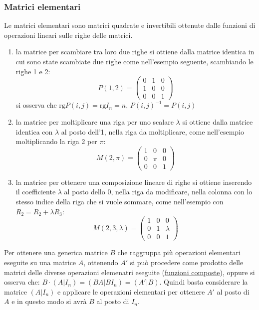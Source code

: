 \documentclass[a4paper]{article}
\newcommand\rg{\text{rg}} 		%
\begin{document}
\subsubsection*{Matrici elementari}
Le matrici elementari sono matrici quadrate e invertibili ottenute dalle funzioni di operazioni lineari sulle righe delle matrici.
\begin{enumerate}
	\item la matrice per scambiare tra loro due righe si ottiene dalla matrice identica in cui sono state scambiate due righe
	come nell'esempio seguente, scambiando le righe 1 e 2:
	\[P(1,2) = \begin{pmatrix}
		0 & 1 & 0 \\
		1 & 0 & 0 \\
		0 & 0 & 1
	\end{pmatrix}\]
	si osserva che \(\rg P(i,j) = \rg I_n = n\), \(P(i,j)^{-1} = P(i,j)\)
	
	\item la matrice per moltiplicare una riga per uno scalare \(\lambda\) si ottiene dalla matrice identica con \(\lambda\)
	al posto dell'1, nella riga da moltiplicare, come nell'esempio moltiplicando la riga 2 per \(\pi\):
	\[M(2,\pi) = \begin{pmatrix}
		1 & 0 & 0 \\
		0 & \pi & 0 \\
		0 & 0 & 1
	\end{pmatrix}\]
	
	\item la matrice per ottenere una composizione lineare di righe si ottiene inserendo il coefficiente \(\lambda\) al posto
	dello 0, nella riga da modificare, nella colonna con lo stesso indice della riga che si vuole sommare, come nell'esempio
	con \(R_2 = R_2 + \lambda R_3\):
	\[M(2, 3, \lambda) = \begin{pmatrix}
		1 & 0 & 0 \\
		0 & 1 & \lambda \\
		0 & 0 & 1
	\end{pmatrix}\]
\end{enumerate}

Per ottenere una generica matrice \(B\) che raggruppa più operazioni elementari eseguite su una matrice \(A\), ottenendo \(A'\)
si può procedere come prodotto delle matrici delle diverse operazioni elemenatri eseguite (\hyperlink{composizioneFunzioniCambiamentiDiBase}{funzioni composte}),
oppure si osserva che: \(B \cdot (A|I_n) = (BA | BI_n) = (A'|B)\). Quindi basta considerare la matrice \((A|I_n)\) e applicare
le operazioni elementari per ottenere \(A'\) al posto di \(A\) e in questo modo si avrà \(B\) al posto di \(I_n\).
\end{document}
